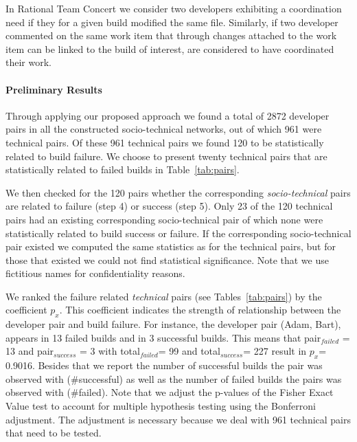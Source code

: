 \documentclass[conference]{IEEEtran}
\begin{document}
In Rational Team Concert we consider two developers exhibiting a coordination need if they for a given build modified the same file.
Similarly, if two developer commented on the same work item that through changes attached to the work item can be linked to the build of interest, are considered to have coordinated their work.



\paragraph{Preliminary Results}
Through applying our proposed approach we found a total of 2872 developer pairs in all the constructed
socio-technical networks, out of which 961 were technical pairs.
Of these 961 technical pairs we found 120 to be statistically related to build failure. 
We choose to present twenty technical pairs that are statistically related to failed builds in Table~\ref{tab:pairs}.

We then checked for the 120 pairs whether the corresponding \emph{socio-technical} pairs are related to failure (step 4) or success (step 5).
Only 23 of the 120 technical pairs had an existing corresponding socio-technical pair of which none were statistically related to build success or failure. 
If the corresponding socio-technical pair existed we computed the same statistics as for the technical pairs, but for those that existed we could not find statistical significance.
Note that we use fictitious names for confidentiality reasons.

We ranked the failure related \emph{technical} pairs (see Tables~\ref{tab:pairs})
by the coefficient $p_{x}$. This coefficient indicates the strength of
relationship between the developer pair and build failure. For instance, the
developer pair (Adam, Bart), appears in 13 failed builds and in 3
successful builds. This means that pair$_{failed}$ = 13 and pair$_{success}$ = 3
with total$_{failed}$= 99 and total$_{success}$= 227 result in $p_x$= 0.9016.
Besides that we report the number of successful builds the pair was observed with
(\#successful) as well as the number of failed builds the pairs was observed with
(\#failed). 
Note that we adjust the p-values of the Fisher Exact Value test to account for multiple hypothesis testing using the Bonferroni adjustment.
The adjustment is necessary because we deal with 961 technical pairs that need to be tested. 
\end{document}
